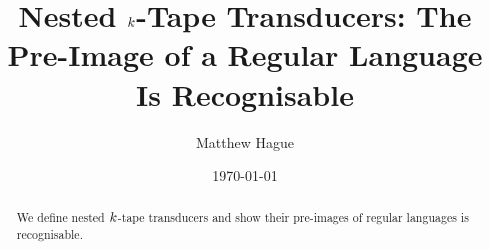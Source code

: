 \documentclass{article}
\title{Nested $k$-Tape Transducers: The Pre-Image of a Regular Language Is Recognisable}
\author{Matthew Hague}
\date{\today}
\begin{document}
\maketitle

\begin{abstract}
    We define nested $k$-tape transducers and show their pre-images of regular languages is recognisable.
\end{abstract}




\end{document}
